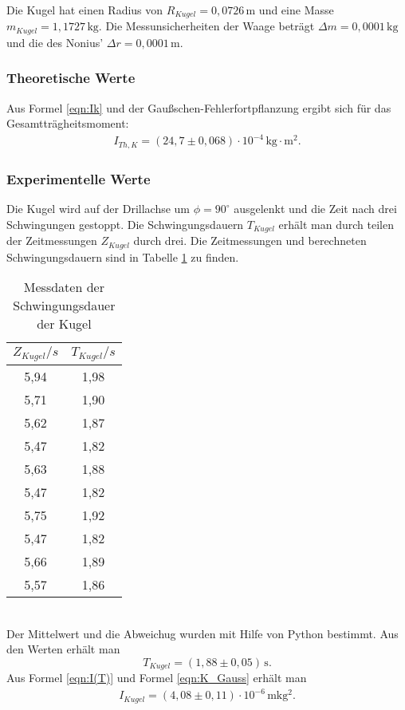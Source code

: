 Die Kugel hat einen Radius von $R_{Kugel} = 0{,}0726\,\mathrm{m} $ und eine Masse $m_{Kugel} = 1{,}1727 \,\mathrm{kg} $.
Die Messunsicherheiten der Waage beträgt $\Delta m = 0,0001\, \mathrm{kg}$ und die des Nonius' $\Delta r = 0,0001\, \mathrm{m}$.

\label{sec:TraegheitsmomentderKugel}

\subsubsection{Theoretische Werte}

Aus Formel \ref{eqn:Ik} und der Gaußschen-Fehlerfortpflanzung ergibt sich für das Gesamtträgheitsmoment:
\begin{align*}
  I_{Th, K} = \left(24{,}7 \pm 0{,}068 \right) \cdot 10^{-4} \, \mathrm{kg}\cdot\mathrm{m^2}.
\end{align*}

\subsubsection{Experimentelle Werte}
Die Kugel wird auf der Drillachse um $\phi = 90^{\circ}$ ausgelenkt und die Zeit nach drei
Schwingungen gestoppt. Die Schwingungsdauern $T_{Kugel}$ erhält man durch teilen der Zeitmessungen
$Z_{Kugel}$ durch drei. Die Zeitmessungen und berechneten Schwingungsdauern sind in
Tabelle \ref{tab:T_Kugel} zu finden.
\begin{table}
  \centering
  \caption{Messdaten der Schwingungsdauer der Kugel}
  \label{tab:T_Kugel}
  \begin{tabular}{c c}
    \toprule
    $Z_{Kugel}/s$ & $T_{Kugel}/s$ \\
    \midrule
    5,94 & 1,98 \\
    5,71 & 1,90 \\
    5,62 & 1,87 \\
    5,47 & 1,82 \\
    5,63 & 1,88 \\
    5,47 & 1,82 \\
    5,75 & 1,92 \\
    5,47 & 1,82 \\
    5,66 & 1,89 \\
    5,57 & 1,86 \\
    \bottomrule
  \end{tabular}
\end{table}
\\
Der Mittelwert und die Abweichug wurden mit Hilfe von Python bestimmt. Aus den Werten erhält man
\begin{equation}
  T_{Kugel} = (1{,}88 \pm 0{,}05)\, \mathrm{s} .
\end{equation}
Aus Formel \ref{eqn:I(T)} und Formel \ref{eqn:K_Gauss} erhält man
\begin{align*}
  I_{Kugel} = (4{,}08 \pm 0{,}11)\cdot 10^{-6}\, \mathrm{mkg^2}.
\end{align*}

